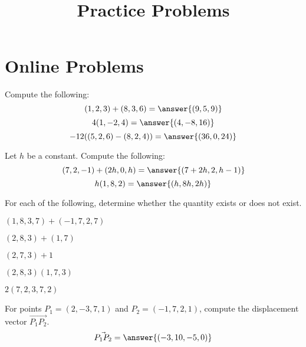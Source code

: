 \documentclass{ximera}
\title{Practice Problems}
\begin{document}
\begin{abstract}
\end{abstract}
\maketitle
\section{Online Problems}
\begin{problem}
Compute the following:
\[
(1,2,3)+(8,3,6)=\answer{(9,5,9)}
\]
\[
4(1,-2,4)=\answer{(4,-8,16)}
\]
\[
-12((5,2,6)-(8,2,4))=\answer{(36,0,24)}
\]
\end{problem}

\begin{problem}
Let $h$ be a constant. Compute the following:
\[
(7,2,-1)+(2h,0,h)=\answer{(7+2h,2,h-1)}
\]
\[
h(1,8,2)=\answer{(h,8h,2h)}
\]
\end{problem}

\begin{problem}
For each of the following, determine whether the quantity exists or does not exist.

$(1,8,3,7)+(-1,7,2,7)$
\begin{multipleChoice}
\end{multipleChoice}

$(2,8,3)+(1,7)$
\begin{multipleChoice}
\end{multipleChoice}

$(2,7,3)+1$
\begin{multipleChoice}
\end{multipleChoice}

$(2,8,3)(1,7,3)$
\begin{multipleChoice}
\end{multipleChoice}

$2(7,2,3,7,2)$
\begin{multipleChoice}
\end{multipleChoice}

\end{problem}

\begin{problem}
For points $P_1=(2,-3,7,1)$ and $P_2=(-1,7,2,1)$, compute the displacement vector $\vec{P_1P_2}$.
\[
\vec{P_1P_2} = \answer{(-3,10,-5,0)}
\]
\end{problem}
\end{document}

